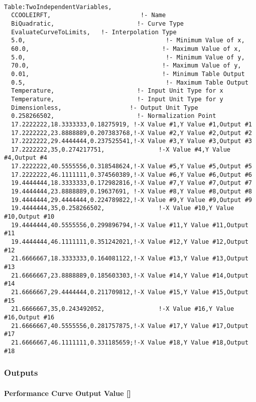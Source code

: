 \begin{lstlisting}

Table:TwoIndependentVariables,
  CCOOLEIRFT,                         !- Name
  BiQuadratic,                       !- Curve Type
  EvaluateCurveToLimits,   !- Interpolation Type
  5.0,                                       !- Minimum Value of x,
  60.0,                                     !- Maximum Value of x,
  5.0,                                       !- Minimum Value of y,
  70.0,                                     !- Maximum Value of y,
  0.01,                                     !- Minimum Table Output
  0.5,                                       !- Maximum Table Output
  Temperature,                       !- Input Unit Type for x
  Temperature,                       !- Input Unit Type for y
  Dimensionless,                   !- Output Unit Type
  0.258266502,                       !- Normalization Point
  17.2222222,18.3333333,0.18275919, !-X Value #1,Y Value #1,Output #1
  17.2222222,23.8888889,0.207383768,!-X Value #2,Y Value #2,Output #2
  17.2222222,29.4444444,0.237525541,!-X Value #3,Y Value #3,Output #3
  17.2222222,35,0.274217751,               !-X Value #4,Y Value #4,Output #4
  17.2222222,40.5555556,0.318548624,!-X Value #5,Y Value #5,Output #5
  17.2222222,46.1111111,0.374560389,!-X Value #6,Y Value #6,Output #6
  19.4444444,18.3333333,0.172982816,!-X Value #7,Y Value #7,Output #7
  19.4444444,23.8888889,0.19637691, !-X Value #8,Y Value #8,Output #8
  19.4444444,29.4444444,0.224789822,!-X Value #9,Y Value #9,Output #9
  19.4444444,35,0.258266502,               !-X Value #10,Y Value #10,Output #10
  19.4444444,40.5555556,0.299896794,!-X Value #11,Y Value #11,Output #11
  19.4444444,46.1111111,0.351242021,!-X Value #12,Y Value #12,Output #12
  21.6666667,18.3333333,0.164081122,!-X Value #13,Y Value #13,Output #13
  21.6666667,23.8888889,0.185603303,!-X Value #14,Y Value #14,Output #14
  21.6666667,29.4444444,0.211709812,!-X Value #15,Y Value #15,Output #15
  21.6666667,35,0.243492052,               !-X Value #16,Y Value #16,Output #16
  21.6666667,40.5555556,0.281757875,!-X Value #17,Y Value #17,Output #17
  21.6666667,46.1111111,0.331185659;!-X Value #18,Y Value #18,Output #18
\end{lstlisting}

\subsubsection{Outputs}\label{outputs-1-017}

\paragraph{\texorpdfstring{Performance Curve Output Value {[]}}{Performance Curve Output Value }}\label{performance-curve-output-value-1}

